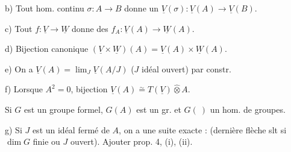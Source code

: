 b) Tout hom. continu $\sigma:A\longrightarrow B$ donne un $\underline V(\sigma):\underline V(A)\longrightarrow\underline V(B)$.

c) Tout $f:\underline V\longrightarrow\underline W$ donne des $f_A:\underline V(A)\longrightarrow\underline W(A)$.

d) Bijection canonique $(\underline V\times\underline W)(A)=\underline V(A)\times\underline W(A)$.

e) On a $\underline V(A)=\lim_J\underline V(A/J)$ ($J$ idéal ouvert) par constr.

f) Lorsque $A^2=0$, bijection $\underline V(A)\overset{\sim}{=}T(\underline V)\widehat\otimes A$.

Si $G$ est un groupe formel, $G(A)$ est un gr. et $G(\ )$ un hom. de groupes.

g) Si $J$ est un idéal fermé de $A$, on a une suite exacte :
(dernière flèche slt si $\dim G$ finie ou $J$ ouvert). Ajouter prop. 4, (i), (ii).

